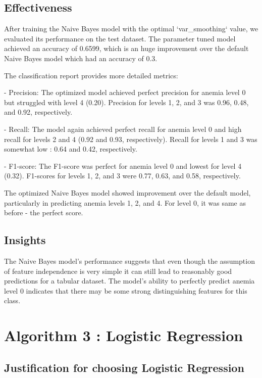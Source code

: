 \subsection{Effectiveness}
After training the Naive Bayes model with the optimal `var\_smoothing` value, we evaluated its performance on the test dataset. The parameter tuned model achieved an accuracy of 0.6599, which is an huge improvement over the default Naive Bayes model which had an accuracy of 0.3.

The classification report provides more detailed metrics:


- Precision: The optimized model achieved perfect precision for anemia level 0 but struggled with level 4 (0.20). Precision for levels 1, 2, and 3 was 0.96, 0.48, and 0.92, respectively.


- Recall: The model again achieved perfect recall for anemia level 0 and high recall for levels 2 and 4 (0.92 and 0.93, respectively). Recall for levels 1 and 3 was somewhat low : 0.64 and 0.42, respectively.


- F1-score: The F1-score was perfect for anemia level 0 and lowest for level 4 (0.32). F1-scores for levels 1, 2, and 3 were 0.77, 0.63, and 0.58, respectively.

The optimized Naive Bayes model showed improvement over the default model, particularly in predicting anemia levels 1, 2, and 4. For level 0, it was same as before - the perfect score.

\subsection{Insights}

The Naive Bayes model's performance suggests that even though the assumption of feature independence is very simple it can still lead to reasonably good predictions for a tabular dataset. The model's ability to perfectly predict anemia level 0 indicates that there may be some strong distinguishing features for this class.


\section{Algorithm 3 : Logistic Regression}

\subsection{Justification for choosing Logistic Regression}

